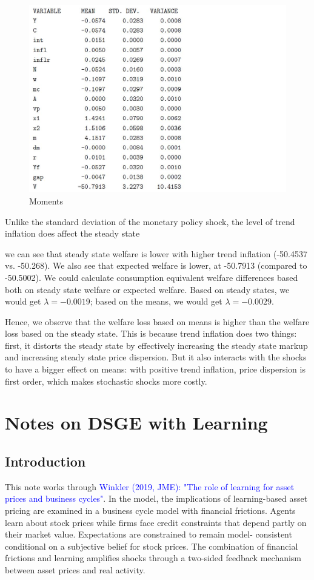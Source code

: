 \documentclass[10pt,math=newtx,citestyle=gb7714-2015,bibstyle=gb7714-2015]{elegantbook}
\begin{document}
{{		\begin{figure}[htbp!]
			\centering
			\includegraphics[width=0.8\linewidth]{FIG/moment1}
			\caption{Moments}\label{6.5}
			\centering
		\end{figure}
		
		Unlike the standard deviation of the monetary policy shock, the level of trend inflation does affect the steady state { we can see that steady state welfare is lower with higher trend inflation (-50.4537 vs. -50.268). We also see that expected welfare is lower, at -50.7913 (compared to -50.5002). We could calculate consumption equivalent welfare differences based both on steady state welfare or expected welfare. Based on steady states, we would get $\lambda = -0.0019$; based on the means, we would get $\lambda = -0.0029$.
			
			Hence, we observe that the welfare loss based on means is higher than the welfare loss based on the steady state. This is because trend inflation does two things: first, it distorts the steady state by effectively increasing the steady state markup and increasing steady state price dispersion. But it also interacts with the shocks to have a bigger effect on means: with positive trend inflation, price dispersion is first order, which makes stochastic shocks more costly.
			
	\chapter{Notes on DSGE with Learning}
	\section{Introduction}
	
	This note works through \textcolor{blue}{Winkler (2019, JME): "The role of learning for asset prices and business cycles"}. In the model, the implications of learning-based asset pricing are examined in a business cycle model with financial frictions. Agents learn about stock prices while firms face credit constraints that depend partly on their market value. Expectations are constrained to remain model- consistent conditional on a subjective belief for stock prices. The combination of financial frictions and learning amplifies shocks through a two-sided feedback mechanism between asset prices and real activity.
	
}}}
\end{document}
